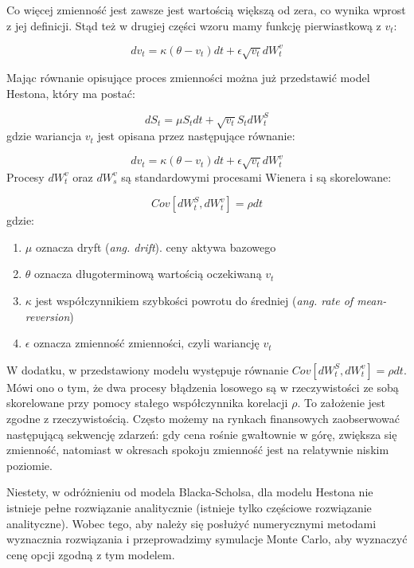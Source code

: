 \documentclass{pracamgr}
\begin{document}
Co więcej zmienność jest zawsze jest wartością większą od zera, co wynika wprost z jej definicji. Stąd też w drugiej części wzoru mamy funkcję pierwiastkową z $v_t$: 

\begin{equation} 
dv_t  = \kappa (\theta - v_t)dt + \epsilon \sqrt{v_t} dW_t^v 
\end{equation}

Mając równanie opisujące proces zmienności można już przedstawić model Hestona, który ma postać:

\begin{equation}
dS_t  = \mu S_t dt + \sqrt{v_t} S_t dW^S_t
\end{equation}
gdzie wariancja $v_t$ jest opisana przez następujące równanie: 

\begin{equation}
dv_t  = \kappa (\theta - v_t)dt + \epsilon \sqrt{v_t} dW_t^v 
\end{equation}
Procesy $dW_t^v$ oraz $dW_s^v$ są standardowymi procesami Wienera i są skorelowane:

\begin{equation}
Cov[dW^S_t, dW^v_t] = \rho dt 
\end{equation}
gdzie:

\begin{enumerate}
\item $\mu$ oznacza dryft (\textit{ang. drift}). ceny aktywa bazowego 
\item $\theta$ oznacza długoterminową wartością oczekiwaną $v_t$
\item $\kappa$ jest współczynnikiem szybkości powrotu do średniej (\textit{ang. rate of mean-reversion})
\item $\epsilon$ oznacza zmienność zmienności, czyli wariancję $v_t$
\end{enumerate}

W dodatku, w przedstawiony modelu występuje równanie $Cov[dW^S_t, dW^v_t] = \rho dt $. Mówi ono o tym, że 
dwa procesy błądzenia losowego są w rzeczywistości ze sobą skorelowane przy pomocy stałego współczynnika 
korelacji $\rho$.
To założenie jest zgodne z rzeczywistością. Często możemy na rynkach finansowych zaobserwować następującą sekwencję zdarzeń: gdy cena rośnie gwałtownie w górę, zwiększa się zmienność, 
natomiast w okresach spokoju zmienność jest na relatywnie niskim poziomie.

Niestety, w odróżnieniu od modela Blacka-Scholsa, dla modelu Hestona nie istnieje pełne rozwiązanie analitycznie (istnieje tylko częściowe rozwiązanie analityczne). Wobec tego, aby należy się posłużyć numerycznymi metodami wyznacznia rozwiązania i przeprowadzimy symulacje Monte Carlo, aby wyznaczyć 
cenę opcji zgodną z tym modelem.
\end{document}
